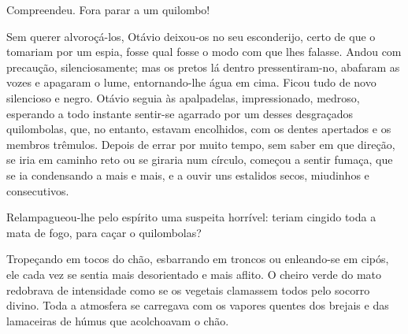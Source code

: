 {Compreendeu. Fora parar a um quilombo!\label{Ref7}




Sem querer alvoroçá-los, Otávio deixou-os no
seu esconderijo, certo de que o tomariam por um espia, fosse
qual fosse o modo com que lhes falasse. Andou com precaução,
silenciosamente; mas os pretos lá dentro pressentiram-no,
abafaram as vozes e apagaram o lume, entornando-lhe água em
cima. Ficou tudo de novo silencioso e negro. Otávio seguia
às apalpadelas, impressionado, medroso, esperando a todo
instante sentir-se agarrado por um desses desgraçados quilombolas, que,
no entanto, estavam encolhidos, com os dentes apertados e os membros
trêmulos. Depois de errar por muito tempo, sem saber em que direção, se
iria em caminho reto ou se giraria num círculo, começou a
sentir fumaça, que se ia condensando a mais e mais, e a ouvir uns
estalidos secos, miudinhos e consecutivos.

Relampagueou-lhe pelo espírito uma suspeita horrível:
teriam cingido toda a mata de fogo, para caçar o quilombolas?

Tropeçando em tocos do chão, esbarrando em troncos ou
enleando-se em cipós, ele cada vez se sentia mais desorientado e mais
aflito. O cheiro verde do mato redobrava de intensidade como se os
vegetais clamassem todos pelo socorro divino. Toda a atmosfera se
carregava com os vapores quentes dos brejais e das lamaceiras
de húmus que acolchoavam o chão.

}
